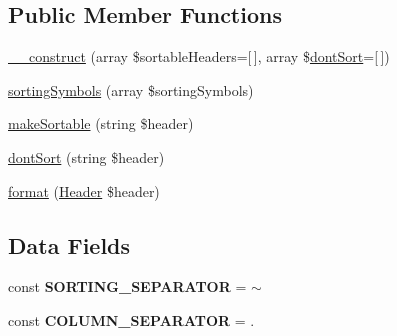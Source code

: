 \subsection*{Public Member Functions}
\begin{DoxyCompactItemize}
\item 
\hyperlink{classhamburgscleanest_1_1_data_tables_1_1_models_1_1_header_formatters_1_1_sortable_header_ae425990a4233288ed86fc75dc6059738}{\+\_\+\+\_\+construct} (array \$sortable\+Headers=\mbox{[}$\,$\mbox{]}, array \$\hyperlink{classhamburgscleanest_1_1_data_tables_1_1_models_1_1_header_formatters_1_1_sortable_header_afac8d813b0a89bf0c7c6ce1c7a053dfd}{dont\+Sort}=\mbox{[}$\,$\mbox{]})
\item 
\hyperlink{classhamburgscleanest_1_1_data_tables_1_1_models_1_1_header_formatters_1_1_sortable_header_a85a83d247ad5c4e8c00fe00b646b031c}{sorting\+Symbols} (array \$sorting\+Symbols)
\item 
\hyperlink{classhamburgscleanest_1_1_data_tables_1_1_models_1_1_header_formatters_1_1_sortable_header_ac59bec60dbfa5e8cf5009736b4d07068}{make\+Sortable} (string \$header)
\item 
\hyperlink{classhamburgscleanest_1_1_data_tables_1_1_models_1_1_header_formatters_1_1_sortable_header_afac8d813b0a89bf0c7c6ce1c7a053dfd}{dont\+Sort} (string \$header)
\item 
\hyperlink{classhamburgscleanest_1_1_data_tables_1_1_models_1_1_header_formatters_1_1_sortable_header_aa5aeddf9c056d9583b29322f75f70f82}{format} (\hyperlink{classhamburgscleanest_1_1_data_tables_1_1_models_1_1_header}{Header} \$header)
\end{DoxyCompactItemize}
\subsection*{Data Fields}
\begin{DoxyCompactItemize}
\item 
\mbox{\label{classhamburgscleanest_1_1_data_tables_1_1_models_1_1_header_formatters_1_1_sortable_header_a087c53f1298172fcd6792a9e6d094786}} 
const {\bfseries S\+O\+R\+T\+I\+N\+G\+\_\+\+S\+E\+P\+A\+R\+A\+T\+OR} = \textquotesingle{}$\sim$\textquotesingle{}
\item 
\mbox{\label{classhamburgscleanest_1_1_data_tables_1_1_models_1_1_header_formatters_1_1_sortable_header_a3506ba6f9fa4c5bb1fa04da91367e6bd}} 
const {\bfseries C\+O\+L\+U\+M\+N\+\_\+\+S\+E\+P\+A\+R\+A\+T\+OR} = \textquotesingle{}.\textquotesingle{}
\end{DoxyCompactItemize}


